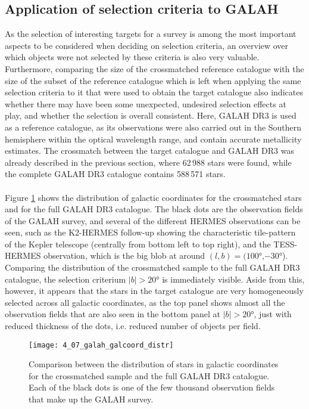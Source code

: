 \documentclass[a4paper,11pt]{article}
\begin{document}
\subsection{Application of selection criteria to GALAH}\label{selcrit_galah}
As the selection of interesting targets for a survey is among the most important aspects to be considered when deciding on selection criteria, an overview over which objects were not selected by these criteria is also very valuable. Furthermore, comparing the size of the crossmatched reference catalogue with the size of the subset of the reference catalogue which is left when applying the same selection criteria to it that were used to obtain the target catalogue also indicates whether there may have been some unexpected, undesired selection effects at play, and whether the selection is overall consistent. Here, GALAH DR3 is used as a reference catalogue, as its observations were also carried out in the Southern hemisphere within the optical wavelength range, and contain accurate metallicity estimates. The crossmatch between the target catalogue and GALAH DR3 was already described in the previous section, where 62\,988 stars were found, while the complete GALAH DR3 catalogue contains 588\,571 stars.\\ \\
%
Figure \ref{fig:galah_galcoord} shows the distribution of galactic coordinates for the crossmatched stars and for the full GALAH DR3 catalogue. The black dots are the observation fields of the GALAH survey, and several of the different HERMES observations can be seen, such as the K2-HERMES follow-up showing the characteristic tile-pattern of the Kepler telescope (centrally from bottom left to top right), and the TESS-HERMES observation, which is the big blob at around $(l,b)=(100$°,$-30$°). Comparing the distribution of the crossmatched sample to the full GALAH DR3 catalogue, the selection criterium $|b|>20$° is immediately visible. Aside from this, however, it appears that the stars in the target catalogue are very homogeneously selected across all galactic coordinates, as the top panel shows almost all the observation fields that are also seen in the bottom panel at $|b|>20$°, just with reduced thickness of the dots, i.e. reduced number of objects per field.
%
\begin{figure}[ht]
 \centering
 \texttt{[image: 4\_07\_galah\_galcoord\_distr]}
 \caption[Galactic coordinate distribution in GALAH]{Comparison between the distribution of stars in galactic coordinates for the crossmatched sample and the full GALAH DR3 catalogue. Each of the black dots is one of the few thousand observation fields that make up the GALAH survey.}
 \label{fig:galah_galcoord}
\end{figure}\\ \\
\end{document}
